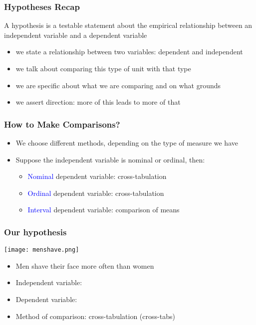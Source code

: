 \documentclass{beamer}
\newcommand{\blue}{\textcolor{blue}}
\begin{document}
\begin{frame}
 \frametitle<+->{Hypotheses Recap}
 A hypothesis is a \alert{testable statement about the empirical relationship between an independent variable and a dependent variable}
 \begin{itemize}[<+->]
   \item we state a \alert{relationship} between two variables: dependent and independent
   \item we talk about \alert{comparing} this type of unit with that type
   \item we are \alert{specific} about what we are comparing and on what grounds
   \item we assert \alert{direction}: more of this leads to more of that 
 \end{itemize}
\end{frame}

\begin{frame}
 \frametitle<+->{How to Make Comparisons?}
 \begin{itemize}[<+->]
   \item We choose different methods, depending on the \alert{type of measure} we have
   \item Suppose the \alert{independent variable} is nominal or ordinal, then:
     \begin{itemize}
       \item \blue{Nominal} \alert{dependent variable}: cross-tabulation
       \item \blue{Ordinal} \alert{dependent variable}: cross-tabulation
       \item \blue{Interval} \alert{dependent variable}: comparison of means
     \end{itemize}
 \end{itemize}
\end{frame}

\begin{frame}
 \frametitle<+->{Our hypothesis}
 \begin{minipage}{.48\linewidth}
 \texttt{[image: menshave.png]}
 \end{minipage}\hfill
 \begin{minipage}{.48\linewidth}
 \begin{itemize}[<+->]
   \item Men shave their face more often than women
   \item Independent variable:    
   \item<6-> Dependent variable:    
   \item Method of comparison: cross-tabulation (cross-tabs)
 \end{itemize}
 \end{minipage}
\end{frame}
\end{document}

